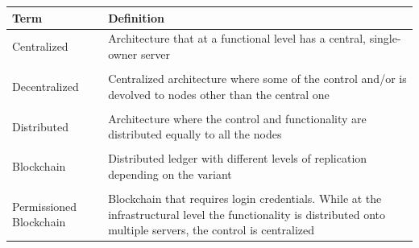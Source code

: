 {\small
\begin{longtable}[]{@{}ll@{}}
\toprule
\begin{minipage}[b]{0.2\columnwidth}\raggedright\strut
\textbf{Term}\strut
\end{minipage} & \begin{minipage}[b]{0.77\columnwidth}\raggedright\strut
\textbf{Definition}\strut
\end{minipage}\tabularnewline
\midrule
\endhead
\begin{minipage}[t]{0.2\columnwidth}\raggedright\strut
Centralized
\strut
\end{minipage} & \begin{minipage}[t]{0.77\columnwidth}\raggedright\strut
Architecture that at a functional level has a central, single-owner server
\strut
\end{minipage}
\tabularnewline\tabularnewline
\begin{minipage}[t]{0.2\columnwidth}\raggedright\strut
Decentralized
\strut
\end{minipage} & \begin{minipage}[t]{0.77\columnwidth}\raggedright\strut
Centralized architecture where some of the control and/or is devolved to nodes other than the central one
\strut
\end{minipage}
\tabularnewline\tabularnewline
\begin{minipage}[t]{0.2\columnwidth}\raggedright\strut
Distributed
\strut
\end{minipage} & \begin{minipage}[t]{0.77\columnwidth}\raggedright\strut
Architecture where the control and functionality are distributed equally to all the nodes
\strut
\end{minipage}

\tabularnewline\tabularnewline
\begin{minipage}[t]{0.2\columnwidth}\raggedright\strut
Blockchain
\strut
\end{minipage} & \begin{minipage}[t]{0.77\columnwidth}\raggedright\strut
Distributed ledger with different levels of replication depending on the variant
\strut
\end{minipage}

\tabularnewline\tabularnewline
\begin{minipage}[t]{0.2\columnwidth}\raggedright\strut
Permissioned Blockchain
\strut
\end{minipage} & \begin{minipage}[t]{0.77\columnwidth}\raggedright\strut
Blockchain that requires login credentials. While at the infrastructural level the functionality is distributed onto multiple servers, the control is centralized
\strut
\end{minipage}


\end{longtable}}
